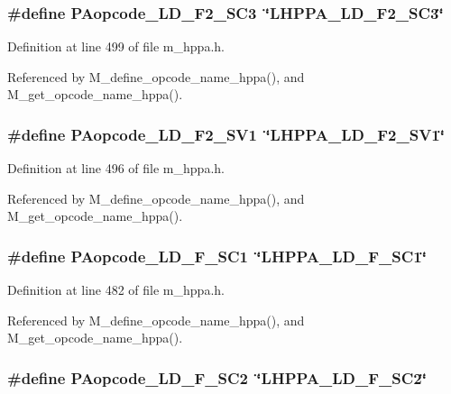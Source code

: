 \subsubsection{\setlength{\rightskip}{0pt plus 5cm}\#define PAopcode\_\-LD\_\-F2\_\-SC3~\char`\"{}LHPPA\_\-LD\_\-F2\_\-SC3\char`\"{}}\label{m__hppa_8h_682774dd1c1759e24b89fc04b7fe2145}




Definition at line 499 of file m\_\-hppa.h.

Referenced by M\_\-define\_\-opcode\_\-name\_\-hppa(), and M\_\-get\_\-opcode\_\-name\_\-hppa().
\subsubsection{\setlength{\rightskip}{0pt plus 5cm}\#define PAopcode\_\-LD\_\-F2\_\-SV1~\char`\"{}LHPPA\_\-LD\_\-F2\_\-SV1\char`\"{}}\label{m__hppa_8h_82c6a998f9352c8d3723cb300d046aa8}




Definition at line 496 of file m\_\-hppa.h.

Referenced by M\_\-define\_\-opcode\_\-name\_\-hppa(), and M\_\-get\_\-opcode\_\-name\_\-hppa().
\subsubsection{\setlength{\rightskip}{0pt plus 5cm}\#define PAopcode\_\-LD\_\-F\_\-SC1~\char`\"{}LHPPA\_\-LD\_\-F\_\-SC1\char`\"{}}\label{m__hppa_8h_8146371be908984d0501479118dd7825}




Definition at line 482 of file m\_\-hppa.h.

Referenced by M\_\-define\_\-opcode\_\-name\_\-hppa(), and M\_\-get\_\-opcode\_\-name\_\-hppa().
\subsubsection{\setlength{\rightskip}{0pt plus 5cm}\#define PAopcode\_\-LD\_\-F\_\-SC2~\char`\"{}LHPPA\_\-LD\_\-F\_\-SC2\char`\"{}}\label{m__hppa_8h_c7dadccab5d7593ac2c0427ae539b58d}




